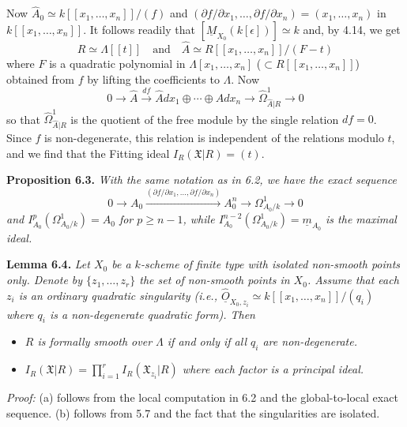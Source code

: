 \documentclass[11pt]{article}
\theoremstyle{plain}
\theoremstyle{definition}
\theoremstyle{remark}
\begin{document}
Now $\widehat{A}_0 \simeq k[[x_1, \ldots, x_n]]/(f)$ and $(\partial f/\partial x_1, \ldots, \partial f/\partial x_n) = (x_1, \ldots, x_n)$ in $k[[x_1, \ldots, x_n]]$. It follows readily that $[\underline{M}_{X_0}(k[\epsilon])] \simeq k$ and, by 4.14, we get
\[R \simeq \Lambda[[t]] \quad \text{and} \quad \widehat{A} \simeq R[[x_1, \ldots, x_n]]/(F - t)\]
where $F$ is a quadratic polynomial in $\Lambda[x_1, \ldots, x_n]$ ($\subset R[[x_1, \ldots, x_n]]$) obtained from $f$ by lifting the coefficients to $\Lambda$. Now
\[0 \to \widehat{A} \xrightarrow{df} \widehat{A}dx_1 \oplus \cdots \oplus \widehat{A}dx_n \longrightarrow \widehat{\Omega}_{\widehat{A}|R}^1 \to 0\]
so that $\widehat{\Omega}_{\widehat{A}|R}^1$ is the quotient of the free module by the single relation $df = 0$. Since $f$ is non-degenerate, this relation is independent of the relations modulo $t$, and we find that the Fitting ideal $I_R(\mathfrak{X}|R) = (t)$.

\medskip
\noindent\textbf{Proposition 6.3.} \textit{With the same notation as in 6.2, we have the exact sequence}
\[0 \to A_0 \xrightarrow{(\partial f/\partial x_1, \ldots, \partial f/\partial x_n)} A_0^n \to \Omega_{A_0/k}^1 \to 0\]
\textit{and $I_{A_0}^p(\Omega_{A_0/k}^1) = A_0$ for $p \geq n-1$, while $I_{A_0}^{n-2}(\Omega_{A_0/k}^1) = \underline{m}_{A_0}$ is the maximal ideal.}

\medskip
\noindent\textbf{Lemma 6.4.} \textit{Let $X_0$ be a $k$-scheme of finite type with isolated non-smooth points only. Denote by $\{z_1, \ldots, z_r\}$ the set of non-smooth points in $X_0$. Assume that each $z_i$ is an ordinary quadratic singularity (i.e., $\widehat{\underline{O}}_{X_0, z_i} \simeq k[[x_1, \ldots, x_n]]/(q_i)$ where $q_i$ is a non-degenerate quadratic form). Then}
\begin{itemize}
\item[(a)] \textit{$R$ is formally smooth over $\Lambda$ if and only if all $q_i$ are non-degenerate.}
\item[(b)] \textit{$I_R(\mathfrak{X}|R) = \prod_{i=1}^r I_R(\mathfrak{X}_{z_i}|R)$ where each factor is a principal ideal.}
\end{itemize}

\medskip
\noindent\textit{Proof:} (a) follows from the local computation in 6.2 and the global-to-local exact sequence. (b) follows from 5.7 and the fact that the singularities are isolated.
\end{document}

